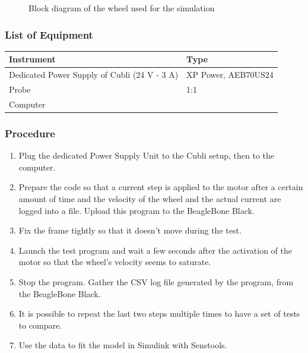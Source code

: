 \begin{figure}[H]
  
  \centering
  \caption{Block diagram of the wheel used for the simulation}
  \label{Parameters}
\end{figure}


\subsubsection{List of Equipment}
\begin{table}[H]
  \begin{tabular}{|l|l|}
    \hline%
    \textbf{Instrument}                                    &  \textbf{Type}            \\
    \hline%
    Dedicated Power Supply of Cubli \small{(24 V - 3 A)}                     &  XP Power, AEB70US24      \\
    \hline%
    Probe                                                                    &  1:1                      \\
    \hline%
    Computer                                        &                           \\
    \hline%
  \end{tabular}
\end{table}

\subsubsection{Procedure}
\begin{enumerate}
  \item Plug the dedicated Power Supply Unit to the Cubli setup, then to the computer.
  \item Prepare the code so that a current step is applied to the motor after a certain amount of time and the velocity of the wheel and the actual current are logged into a file. Upload this program to the BeagleBone Black.
  \item Fix the frame tightly so that it doesn't move during the test.
  \item Launch the test program and wait a few seconds after the activation of the motor so that the wheel's velocity seems to saturate.
  \item Stop the program. Gather the CSV log file generated by the program, from the BeagleBone Black.
  \item It is possible to repeat the last two steps multiple times to have a set of tests to compare.
  \item Use the data to fit the model in Simulink with Senstools.
\end{enumerate}